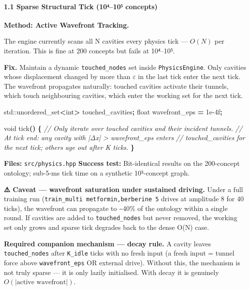 \documentclass[
  11pt,
  a4paper,
]{article}
\newenvironment{Shaded}{\begin{snugshade}}{\end{snugshade}}
\newcommand{\BuiltInTok}[1]{#1}
\newcommand{\CommentTok}[1]{\textcolor[rgb]{0.56,0.35,0.01}{\textit{#1}}}
\newcommand{\DataTypeTok}[1]{\textcolor[rgb]{0.13,0.29,0.53}{#1}}
\newcommand{\FloatTok}[1]{\textcolor[rgb]{0.00,0.00,0.81}{#1}}
\newcommand{\NormalTok}[1]{#1}
\newcommand{\OperatorTok}[1]{\textcolor[rgb]{0.81,0.36,0.00}{\textbf{#1}}}
\begin{document}
\paragraph{1.1 Sparse Structural Tick (10⁴--10⁵
concepts)}\label{sparse-structural-tick-10ux207410ux2075-concepts}

\textbf{Method: Active Wavefront Tracking.}

The engine currently scans all N cavities every physics tick ---
\(O(N)\) per iteration. This is fine at 200 concepts but fails at
10⁴--10⁵.

\textbf{Fix.} Maintain a dynamic \texttt{touched\_nodes} set inside
\texttt{PhysicsEngine}. Only cavities whose displacement changed by more
than \(\varepsilon\) in the last tick enter the next tick. The wavefront
propagates naturally: touched cavities activate their tunnels, which
touch neighbouring cavities, which enter the working set for the next
tick.

\begin{Shaded}
\begin{Highlighting}[]
\BuiltInTok{std::}\NormalTok{unordered\_set}\OperatorTok{\textless{}}\DataTypeTok{int}\OperatorTok{\textgreater{}}\NormalTok{ touched\_cavities}\OperatorTok{;}
\DataTypeTok{float}\NormalTok{ wavefront\_eps }\OperatorTok{=} \FloatTok{1e{-}4}\BuiltInTok{f}\OperatorTok{;}

\DataTypeTok{void}\NormalTok{ tick}\OperatorTok{()} \OperatorTok{\{}
    \CommentTok{// Only iterate over touched cavities and their incident tunnels.}
    \CommentTok{// At tick end: any cavity with |Δx| \textgreater{} wavefront\_eps enters}
    \CommentTok{// touched\_cavities for the next tick; others age out after K ticks.}
\OperatorTok{\}}
\end{Highlighting}
\end{Shaded}

\textbf{Files:} \texttt{src/physics.hpp} \textbf{Success test:}
Bit-identical results on the 200-concept ontology; sub-5-ms tick time on
a synthetic 10⁵-concept graph.

\textbf{⚠️ Caveat --- wavefront saturation under sustained driving.}
Under a full training run (\texttt{train\_multi\ metformin,berberine\ 5}
drives at amplitude 8 for 40 ticks), the wavefront can propagate to
\textasciitilde40\% of the ontology within a single round. If cavities
are added to \texttt{touched\_nodes} but never removed, the working set
only grows and sparse tick degrades back to the dense O(N) case.

\textbf{Required companion mechanism --- decay rule.} A cavity leaves
\texttt{touched\_nodes} after \texttt{K\_idle} ticks with no fresh input
(a fresh input = tunnel force above \texttt{wavefront\_eps} OR external
drive). Without this, the mechanism is not truly sparse --- it is only
lazily initialised. With decay it is genuinely
\(O(|\text{active wavefront}|)\).
\end{document}
